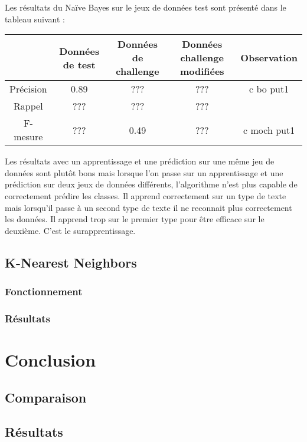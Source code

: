 \documentclass[a4paper]{report}
\begin{document}
                Les résultats du Naïve Bayes sur le jeux de données test sont présenté dans le tableau suivant :

                \begin{center}
                    \begin{tabular}{|c|c|c|c|c|}
                        \hline
                        & Données de test & Données de challenge & Données challenge modifiées & Observation \\
                        \hline
                        Précision & 0.89 & ??? & ??? & c bo put1 \\
                        \hline
                        Rappel & ??? & ??? & ??? &  \\
                        \hline
                        F-mesure & ??? & 0.49 & ??? & c moch put1 \\
                        \hline
                    \end{tabular}
                \end{center}

                Les résultats avec un apprentissage et une prédiction sur une même jeu de données sont plutôt bons mais lorsque l'on passe sur un apprentissage et une prédiction sur deux jeux de données différents, l'algorithme n'est plus capable de correctement prédire les classes. Il apprend correctement sur un type de texte mais lorsqu'il passe à un second type de texte il ne reconnait plus correctement les données. Il apprend trop sur le premier type pour être efficace sur le deuxième. C'est le surapprentissage.

        \section{K-Nearest Neighbors}

            \subsection{Fonctionnement}

            \subsection{Résultats}

    \chapter{Conclusion}

        \section{Comparaison}



        \section{Résultats}
\end{document}
